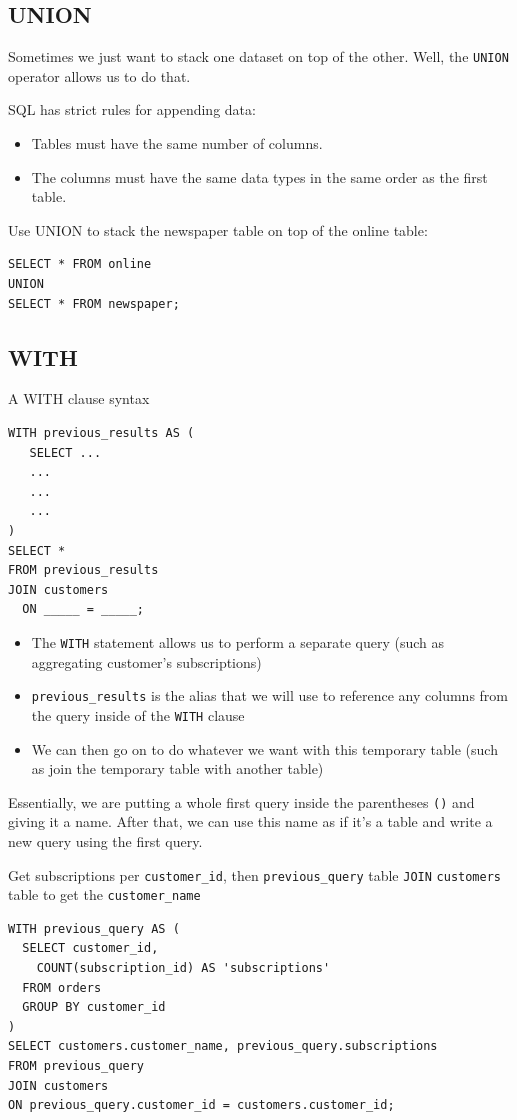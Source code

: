 \documentclass[a4paper, 12pt]{article}
\begin{document}
\subsection{UNION}
Sometimes we just want to stack one dataset on top of the other. Well, the \verb|UNION| operator allows us to do that.

SQL has strict rules for appending data:
\begin{itemize}
\item Tables must have the same number of columns.

\item The columns must have the same data types in the same order as the first table.

\end{itemize}

Use UNION to stack the newspaper table on top of the online table:
\begin{verbatim}
SELECT * FROM online
UNION
SELECT * FROM newspaper;
\end{verbatim}

\subsection{WITH}
A WITH clause syntax
\begin{verbatim}
WITH previous_results AS (
   SELECT ...
   ...
   ...
   ...
)
SELECT *
FROM previous_results
JOIN customers
  ON _____ = _____;
\end{verbatim}
\begin{itemize}
\item The \verb|WITH| statement allows us to perform a separate query (such as aggregating customer's subscriptions)

\item \verb|previous_results| is the alias that we will use to reference any columns from the query inside of the \verb|WITH| clause

\item We can then go on to do whatever we want with this temporary table (such as join the temporary table with another table)	

\end{itemize}
Essentially, we are putting a whole first query inside the parentheses \verb|()| and giving it a name. After that, we can use this name as if it's a table and write a new query using the first query.

Get subscriptions per \verb|customer_id|, then \verb|previous_query| table \verb|JOIN| \verb|customers| table to get the \verb|customer_name|
\begin{verbatim}
WITH previous_query AS (
  SELECT customer_id,
    COUNT(subscription_id) AS 'subscriptions'
  FROM orders
  GROUP BY customer_id
)
SELECT customers.customer_name, previous_query.subscriptions
FROM previous_query
JOIN customers
ON previous_query.customer_id = customers.customer_id;
\end{verbatim}
\end{document}

